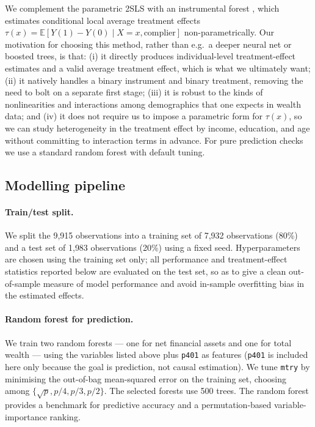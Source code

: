 \documentclass[11pt]{article}
\begin{document}
We complement the parametric 2SLS with an instrumental forest
\citep{athey2019grf}, which estimates conditional local average treatment
effects $\tau(x) = \mathbb{E}[Y(1) - Y(0) \mid X = x, \text{complier}]$
non-parametrically.  Our motivation for choosing this method, rather than
e.g.\ a deeper neural net or boosted trees, is that:
(i) it directly produces individual-level treatment-effect estimates and a
valid average treatment effect, which is what we ultimately want;
(ii) it natively handles a binary instrument and binary treatment, removing
the need to bolt on a separate first stage;
(iii) it is robust to the kinds of nonlinearities and interactions among
demographics that one expects in wealth data; and
(iv) it does not require us to impose a parametric form for $\tau(x)$, so we
can study heterogeneity in the treatment effect by income, education, and age
without committing to interaction terms in advance.  For pure prediction
checks we use a standard random forest with default tuning.

\subsection{Modelling pipeline}

\paragraph{Train/test split.}
We split the 9{,}915 observations into a training set of 7{,}932
observations (80\%) and a test set of 1{,}983 observations (20\%) using a
fixed seed.  Hyperparameters are chosen using the training set only; all
performance and treatment-effect statistics reported below are evaluated on
the test set, so as to give a clean out-of-sample measure of model
performance and avoid in-sample overfitting bias in the estimated effects.

\paragraph{Random forest for prediction.}
We train two random forests --- one for net financial assets and one for total
wealth --- using the variables listed above plus \texttt{p401} as features
(\texttt{p401} is included here only because the goal is prediction, not
causal estimation).  We tune \texttt{mtry} by minimising the out-of-bag
mean-squared error on the training set, choosing among
$\{\sqrt{p}, p/4, p/3, p/2\}$.  The selected forests use 500 trees.  The
random forest provides a benchmark for predictive accuracy and a
permutation-based variable-importance ranking.
\end{document}
